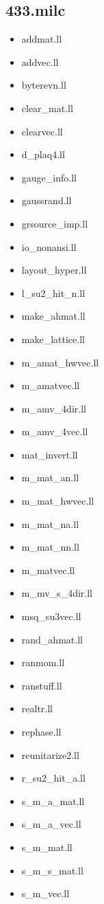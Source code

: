 \begin{multicols}{3}
	\subsection{433.milc}
	\begin{itemize}
		\item addmat.ll
		\item addvec.ll
		\item byterevn.ll
		\item clear\_mat.ll
		\item clearvec.ll
		\item d\_plaq4.ll
		\item gauge\_info.ll
		\item gaussrand.ll
		\item grsource\_imp.ll
		\item io\_nonansi.ll
		\item layout\_hyper.ll
		\item l\_su2\_hit\_n.ll
		\item make\_ahmat.ll
		\item make\_lattice.ll
		\item m\_amat\_hwvec.ll
		\item m\_amatvec.ll
		\item m\_amv\_4dir.ll
		\item m\_amv\_4vec.ll
		\item mat\_invert.ll
		\item m\_mat\_an.ll
		\item m\_mat\_hwvec.ll
		\item m\_mat\_na.ll
		\item m\_mat\_nn.ll
		\item m\_matvec.ll
		\item m\_mv\_s\_4dir.ll
		\item msq\_su3vec.ll
		\item rand\_ahmat.ll
		\item ranmom.ll
		\item ranstuff.ll
		\item realtr.ll
		\item rephase.ll
		\item reunitarize2.ll
		\item r\_su2\_hit\_a.ll
		\item s\_m\_a\_mat.ll
		\item s\_m\_a\_vec.ll
		\item s\_m\_mat.ll
		\item s\_m\_s\_mat.ll
		\item s\_m\_vec.ll

\end{itemize}
\end{multicols}
